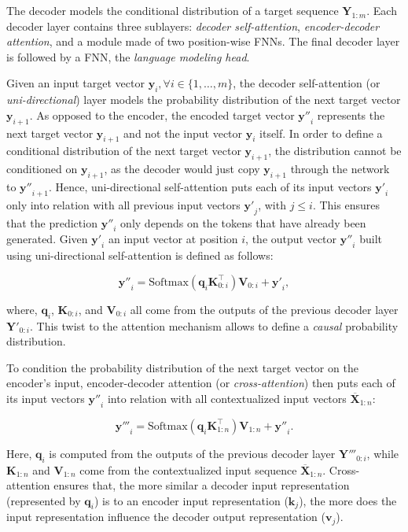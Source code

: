 The decoder models the conditional distribution of a target sequence $\bm{Y}_{1:m}$. Each decoder layer contains three sublayers: \textit{decoder self-attention}, \textit{encoder-decoder attention}, and a module made of two position-wise \acp{FNN}. The final decoder layer is followed by a \ac{FNN}, the \textit{language modeling head}. 

Given an input target vector $\bm{y}_i, \forall i \in \{1, \ldots, m\}$, the decoder self-attention (or \textit{uni-directional}) layer models the probability distribution of the next target vector $\bm{y}_{i+1}$. As opposed to the encoder, the encoded target vector $\bm{y''}_{i}$ represents the next target vector $\bm{y}_{i+1}$ and not the input vector $\bm{y}_{i}$ itself. In order to define a conditional distribution of the next target vector $\bm{y}_{i+1}$, the distribution cannot be conditioned on $\bm{y}_{i+1}$, as the decoder would just copy $\bm{y}_{i+1}$ through the network to $\bm{y''}_{i+1}$. Hence, uni-directional self-attention puts each of its input vectors $\bm{y'}_i$ only into relation with all previous input vectors $\bm{y'}_j$, with $j \leq i$. This ensures that the prediction $\bm{y''}_i$ only depends on the tokens that have already been generated. Given $\bm{y'}_i$ an input vector at position $i$, the output vector $\bm{y''}_i$ built using uni-directional self-attention is defined as follows:

\begin{equation}
    \bm{y''}_i = \mathrm{Softmax}(\bm{q}_i \bm{K}^{\top}_{0:i}) \bm{V}_{0:i} + \bm{y'}_i,
\end{equation}

where, $\bm{q}_i$, $\bm{K}_{0:i}$, and $\bm{V}_{0:i}$ all come from the outputs of the previous decoder layer $\bm{Y'}_{0:i}$. This twist to the attention mechanism allows to define a \textit{causal} probability distribution.

To condition the probability distribution of the next target vector on the encoder's input, encoder-decoder attention (or \textit{cross-attention}) then puts each of its input vectors $\bm{y''}_i$ into relation with all contextualized input vectors $\overline{\bm{X}}_{1:n}$:

\begin{equation}
    \bm{y'''}_i = \mathrm{Softmax}(\bm{q}_i \bm{K}^{\top}_{1:n}) \bm{V}_{1:n} + \bm{y''}_i.
\end{equation}

Here, $\bm{q}_i$ is computed from the outputs of the previous decoder layer $\bm{Y'''}_{0:i}$, while $\bm{K}_{1:n}$ and $\bm{V}_{1:n}$ come from the contextualized input sequence $\overline{\bm{X}}_{1:n}$. Cross-attention ensures that, the more similar a decoder input representation (represented by $\bm{q}_i$) is to an encoder input representation ($\bm{k}_j$), the more does the input representation influence the decoder output representation ($\bm{v}_j$).

